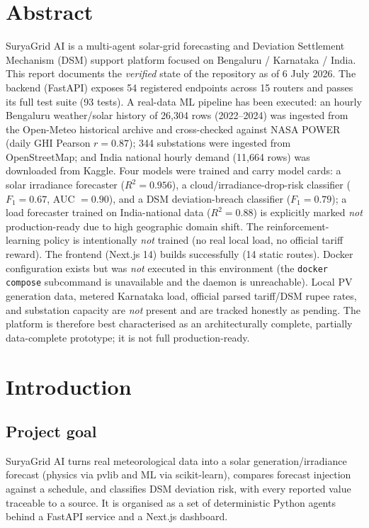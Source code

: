 \documentclass[11pt,a4paper]{article}
\newcommand{\code}[1]{\texttt{\small #1}}
\begin{document}
\section*{Abstract}
SuryaGrid AI is a multi-agent solar-grid forecasting and Deviation Settlement Mechanism
(DSM) support platform focused on Bengaluru / Karnataka / India. This report documents
the \emph{verified} state of the repository as of 6 July 2026. The backend (FastAPI)
exposes 54 registered endpoints across 15 routers and passes its full test suite
(93 tests). A real-data ML pipeline has been executed: an hourly Bengaluru
weather/solar history of 26{,}304 rows (2022--2024) was ingested from the Open-Meteo
historical archive and cross-checked against NASA POWER (daily GHI Pearson
$r=0.87$); 344 substations were ingested from OpenStreetMap; and India national hourly
demand (11{,}664 rows) was downloaded from Kaggle. Four models were trained and carry
model cards: a solar irradiance forecaster ($R^2=0.956$), a cloud/irradiance-drop-risk
classifier ($F_1=0.67$, AUC $=0.90$), and a DSM deviation-breach classifier
($F_1=0.79$); a load forecaster trained on India-national data ($R^2=0.88$) is
explicitly marked \emph{not} production-ready due to high geographic domain shift. The
reinforcement-learning policy is intentionally \emph{not} trained (no real local load,
no official tariff reward). The frontend (Next.js 14) builds successfully (14 static
routes). Docker configuration exists but was \emph{not} executed in this environment
(the \code{docker compose} subcommand is unavailable and the daemon is unreachable).
Local PV generation data, metered Karnataka load, official parsed tariff/DSM rupee
rates, and substation capacity are \emph{not} present and are tracked honestly as
pending. The platform is therefore best characterised as an architecturally complete,
partially data-complete prototype; it is not full production-ready.

\section{Introduction}
\subsection{Project goal}
SuryaGrid AI turns real meteorological data into a solar generation/irradiance forecast
(physics via pvlib and ML via scikit-learn), compares forecast injection against a
schedule, and classifies DSM deviation risk, with every reported value traceable to a
source. It is organised as a set of deterministic Python agents behind a FastAPI service
and a Next.js dashboard.
\end{document}
